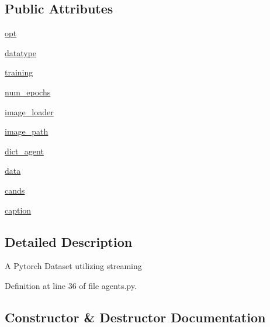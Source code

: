 \subsection*{Public Attributes}
\begin{DoxyCompactItemize}
\item 
\hyperlink{classparlai_1_1tasks_1_1flickr30k_1_1agents_1_1FlickrDataset_a0c37a007795dcd51a466d3420a3a1302}{opt}
\item 
\hyperlink{classparlai_1_1tasks_1_1flickr30k_1_1agents_1_1FlickrDataset_a0fbb201f80953f75baf8b38f685ae380}{datatype}
\item 
\hyperlink{classparlai_1_1tasks_1_1flickr30k_1_1agents_1_1FlickrDataset_a6a5e2312197fc52f45f0d036da16b788}{training}
\item 
\hyperlink{classparlai_1_1tasks_1_1flickr30k_1_1agents_1_1FlickrDataset_a2768ac48773169dee24f6b52ec36dd42}{num\+\_\+epochs}
\item 
\hyperlink{classparlai_1_1tasks_1_1flickr30k_1_1agents_1_1FlickrDataset_a49701d32271d4804b933a96f80133f8a}{image\+\_\+loader}
\item 
\hyperlink{classparlai_1_1tasks_1_1flickr30k_1_1agents_1_1FlickrDataset_aae4aad11c9ddb1cfd7ff524fabc221ee}{image\+\_\+path}
\item 
\hyperlink{classparlai_1_1tasks_1_1flickr30k_1_1agents_1_1FlickrDataset_a72d2298eb6c0b36ce7fd24352d574131}{dict\+\_\+agent}
\item 
\hyperlink{classparlai_1_1tasks_1_1flickr30k_1_1agents_1_1FlickrDataset_a4139a0775f1dc8a2363239a1df2d2463}{data}
\item 
\hyperlink{classparlai_1_1tasks_1_1flickr30k_1_1agents_1_1FlickrDataset_a04dcbf559ebf140bbdfa5ace5fee5fea}{cands}
\item 
\hyperlink{classparlai_1_1tasks_1_1flickr30k_1_1agents_1_1FlickrDataset_a64b9af8183c5ebd7cb220da70d389761}{caption}
\end{DoxyCompactItemize}


\subsection{Detailed Description}
\begin{DoxyVerb}A Pytorch Dataset utilizing streaming\end{DoxyVerb}
 

Definition at line 36 of file agents.\+py.



\subsection{Constructor \& Destructor Documentation}
\mbox{\label{classparlai_1_1tasks_1_1flickr30k_1_1agents_1_1FlickrDataset_a4d5c2bd105faaff6ee0d5ce0e41a6d94}} 

